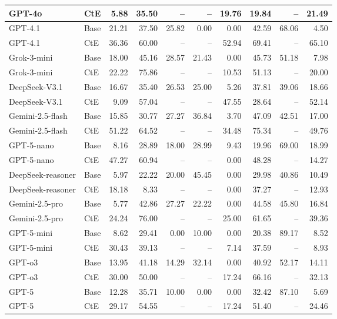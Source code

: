 \begin{table}[!t]
\begin{tabular}{llrrrrrrrr}
GPT-4o & CtE & 5.88 & 35.50 & -- & -- & 19.76 & 19.84 & -- & 21.49 \\
\midrule
GPT-4.1 & Base & 21.21 & 37.50 & 25.82 & 0.00 & 0.00 & 42.59 & 68.06 & 4.50 \\
GPT-4.1 & CtE & 36.36 & 60.00 & -- & -- & 52.94 & 69.41 & -- & 65.10 \\
\midrule
Grok-3-mini & Base & 18.00 & 45.16 & 28.57 & 21.43 & 0.00 & 45.73 & 51.18 & 7.98 \\
Grok-3-mini & CtE & 22.22 & 75.86 & -- & -- & 10.53 & 51.13 & -- & 20.00 \\
\midrule
DeepSeek-V3.1 & Base & 16.67 & 35.40 & 26.53 & 25.00 & 5.26 & 37.81 & 39.06 & 18.66 \\
DeepSeek-V3.1 & CtE & 9.09 & 57.04 & -- & -- & 47.55 & 28.64 & -- & 52.14 \\
\midrule
Gemini-2.5-flash & Base & 15.85 & 30.77 & 27.27 & 36.84 & 3.70 & 47.09 & 42.51 & 17.00 \\
Gemini-2.5-flash & CtE & 51.22 & 64.52 & -- & -- & 34.48 & 75.34 & -- & 49.76 \\
\midrule
GPT-5-nano & Base & 8.16 & 28.89 & 18.00 & 28.99 & 9.43 & 19.96 & 69.00 & 18.99 \\
GPT-5-nano & CtE & 47.27 & 60.94 & -- & -- & 0.00 & 48.28 & -- & 14.27 \\
\midrule
DeepSeek-reasoner & Base & 5.97 & 22.22 & 20.00 & 45.45 & 0.00 & 29.98 & 40.86 & 10.49 \\
DeepSeek-reasoner & CtE & 18.18 & 8.33 & -- & -- & 0.00 & 37.27 & -- & 12.93 \\
\midrule
Gemini-2.5-pro & Base & 5.77 & 42.86 & 27.27 & 22.22 & 0.00 & 44.58 & 45.80 & 16.84 \\
Gemini-2.5-pro & CtE & 24.24 & 76.00 & -- & -- & 25.00 & 61.65 & -- & 39.36 \\
\midrule
GPT-5-mini & Base & 8.62 & 29.41 & 0.00 & 10.00 & 0.00 & 20.38 & 89.17 & 8.52 \\
GPT-5-mini & CtE & 30.43 & 39.13 & -- & -- & 7.14 & 37.59 & -- & 8.93 \\
\midrule
GPT-o3 & Base & 13.95 & 41.18 & 14.29 & 32.14 & 0.00 & 40.92 & 52.17 & 14.11 \\
GPT-o3 & CtE & 30.00 & 50.00 & -- & -- & 17.24 & 66.16 & -- & 32.13 \\
\midrule
GPT-5 & Base & 12.28 & 35.71 & 10.00 & 0.00 & 0.00 & 32.42 & 87.10 & 5.69 \\
GPT-5 & CtE & 29.17 & 54.55 & -- & -- & 17.24 & 51.40 & -- & 24.46 \\
\bottomrule
\end{tabular}
\label{tab:cRi-}
\end{table}
